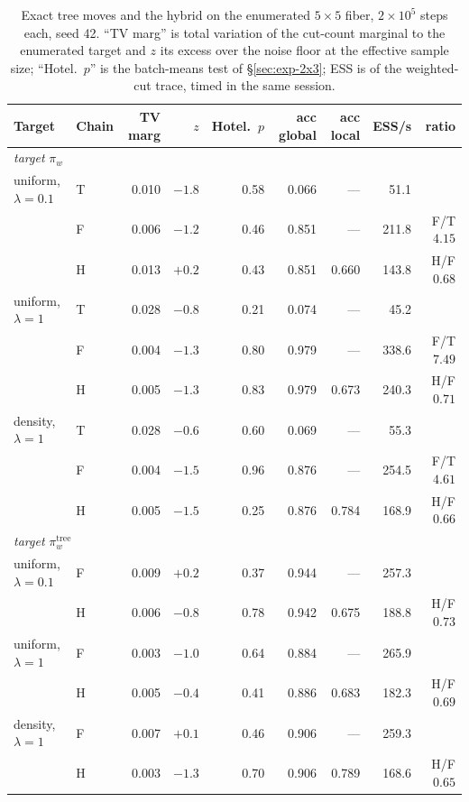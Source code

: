 \documentclass[11pt]{article}
\begin{document}
\begin{table}[htbp]
\centering
\small
\begin{tabular}{llrrrrrrr}
\toprule
Target & Chain & TV marg & $z$ & Hotel.\ $p$ & acc global & acc local & ESS/s & ratio \\
\midrule
\multicolumn{9}{l}{\emph{target} $\pi_w$} \\
uniform, $\lambda{=}0.1$ & T & 0.010 & $-1.8$ & 0.58 & 0.066 & --- & 51.1 & \\
 & F & 0.006 & $-1.2$ & 0.46 & 0.851 & --- & 211.8 & F/T $4.15$ \\
 & H & 0.013 & $+0.2$ & 0.43 & 0.851 & 0.660 & 143.8 & H/F $0.68$ \\
uniform, $\lambda{=}1$ & T & 0.028 & $-0.8$ & 0.21 & 0.074 & --- & 45.2 & \\
 & F & 0.004 & $-1.3$ & 0.80 & 0.979 & --- & 338.6 & F/T $7.49$ \\
 & H & 0.005 & $-1.3$ & 0.83 & 0.979 & 0.673 & 240.3 & H/F $0.71$ \\
density, $\lambda{=}1$ & T & 0.028 & $-0.6$ & 0.60 & 0.069 & --- & 55.3 & \\
 & F & 0.004 & $-1.5$ & 0.96 & 0.876 & --- & 254.5 & F/T $4.61$ \\
 & H & 0.005 & $-1.5$ & 0.25 & 0.876 & 0.784 & 168.9 & H/F $0.66$ \\
\midrule
\multicolumn{9}{l}{\emph{target} $\pi_w^{\mathrm{tree}}$} \\
uniform, $\lambda{=}0.1$ & F & 0.009 & $+0.2$ & 0.37 & 0.944 & --- & 257.3 & \\
 & H & 0.006 & $-0.8$ & 0.78 & 0.942 & 0.675 & 188.8 & H/F $0.73$ \\
uniform, $\lambda{=}1$ & F & 0.003 & $-1.0$ & 0.64 & 0.884 & --- & 265.9 & \\
 & H & 0.005 & $-0.4$ & 0.41 & 0.886 & 0.683 & 182.3 & H/F $0.69$ \\
density, $\lambda{=}1$ & F & 0.007 & $+0.1$ & 0.46 & 0.906 & --- & 259.3 & \\
 & H & 0.003 & $-1.3$ & 0.70 & 0.906 & 0.789 & 168.6 & H/F $0.65$ \\
\bottomrule
\end{tabular}
\caption{Exact tree moves and the hybrid on the enumerated
  $5 \times 5$ fiber, $2 \times 10^5$ steps each, seed 42. ``TV
  marg'' is total variation of the cut-count marginal to the
  enumerated target and $z$ its excess over the noise floor at the
  effective sample size; ``Hotel.\ $p$'' is the batch-means test of
  \S\ref{sec:exp-2x3}; ESS is of the weighted-cut trace, timed in the
  same session.}\label{tab:hybrid-5x5}
\end{table}
\end{document}

